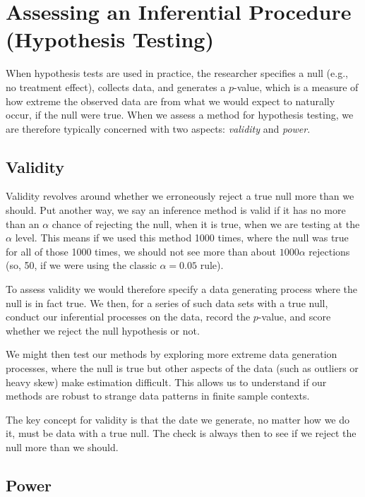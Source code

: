 \documentclass[
]{book}
\begin{document}
\section{Assessing an Inferential Procedure (Hypothesis Testing)}\label{assessing-an-inferential-procedure-hypothesis-testing}

When hypothesis tests are used in practice, the researcher specifies a null (e.g., no treatment effect), collects data, and generates a \(p\)-value, which is a measure of how extreme the observed data are from what we would expect to naturally occur, if the null were true.
When we assess a method for hypothesis testing, we are therefore typically concerned with two aspects: \emph{validity} and \emph{power}.

\subsection{Validity}\label{validity}

Validity revolves around whether we erroneously reject a true null more than we should.
Put another way, we say an inference method is valid if it has no more than an \(\alpha\) chance of rejecting the null, when it is true, when we are testing at the \(\alpha\) level.
This means if we used this method 1000 times, where the null was true for all of those 1000 times, we should not see more than about \(1000 \alpha\) rejections (so, 50, if we were using the classic \(\alpha = 0.05\) rule).

To assess validity we would therefore specify a data generating process where the null is in fact true.
We then, for a series of such data sets with a true null, conduct our inferential processes on the data, record the \(p\)-value, and score whether we reject the null hypothesis or not.

We might then test our methods by exploring more extreme data generation processes, where the null is true but other aspects of the data (such as outliers or heavy skew) make estimation difficult.
This allows us to understand if our methods are robust to strange data patterns in finite sample contexts.

The key concept for validity is that the date we generate, no matter how we do it, must be data with a true null.
The check is always then to see if we reject the null more than we should.

\subsection{Power}\label{power}
\end{document}
